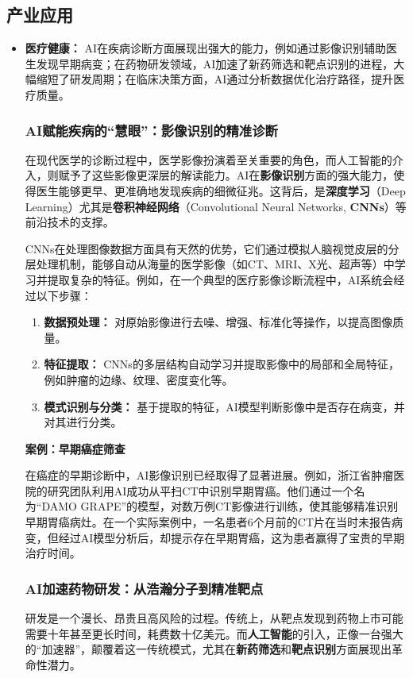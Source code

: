 \subsection{产业应用}

\begin{itemize}
    \item \textbf{医疗健康：} AI在疾病诊断方面展现出强大的能力，例如通过影像识别辅助医生发现早期病变；在药物研发领域，AI加速了新药筛选和靶点识别的进程，大幅缩短了研发周期；在临床决策方面，AI通过分析数据优化治疗路径，提升医疗质量。

    \subsubsection{AI赋能疾病的“慧眼”：影像识别的精准诊断}
    在现代医学的诊断过程中，医学影像扮演着至关重要的角色，而人工智能的介入，则赋予了这些影像更深层的解读能力。AI在\textbf{影像识别}方面的强大能力，使得医生能够更早、更准确地发现疾病的细微征兆。这背后，是\textbf{深度学习}（Deep Learning）尤其是\textbf{卷积神经网络}（Convolutional Neural Networks, \textbf{CNNs}）等前沿技术的支撑。

    CNNs在处理图像数据方面具有天然的优势，它们通过模拟人脑视觉皮层的分层处理机制，能够自动从海量的医学影像（如CT、MRI、X光、超声等）中学习并提取复杂的特征。例如，在一个典型的医疗影像诊断流程中，AI系统会经过以下步骤：
    \begin{enumerate}
        \item \textbf{数据预处理：} 对原始影像进行去噪、增强、标准化等操作，以提高图像质量。
        \item \textbf{特征提取：} CNNs的多层结构自动学习并提取影像中的局部和全局特征，例如肿瘤的边缘、纹理、密度变化等。
        \item \textbf{模式识别与分类：} 基于提取的特征，AI模型判断影像中是否存在病变，并对其进行分类。
    \end{enumerate}

    \textbf{案例：早期癌症筛查}

    在癌症的早期诊断中，AI影像识别已经取得了显著进展。例如，浙江省肿瘤医院的研究团队利用AI成功从平扫CT中识别早期胃癌。他们通过一个名为“DAMO GRAPE”的模型，对数万例CT影像进行训练，使其能够精准识别早期胃癌病灶。在一个实际案例中，一名患者6个月前的CT片在当时未报告病变，但经过AI模型分析后，却提示存在早期胃癌，这为患者赢得了宝贵的早期治疗时间。

    \subsubsection{AI加速药物研发：从浩瀚分子到精准靶点}
    研发是一个漫长、昂贵且高风险的过程。传统上，从靶点发现到药物上市可能需要十年甚至更长时间，耗费数十亿美元。而\textbf{人工智能}的引入，正像一台强大的“加速器”，颠覆着这一传统模式，尤其在\textbf{新药筛选}和\textbf{靶点识别}方面展现出革命性潜力。


\end{itemize}
